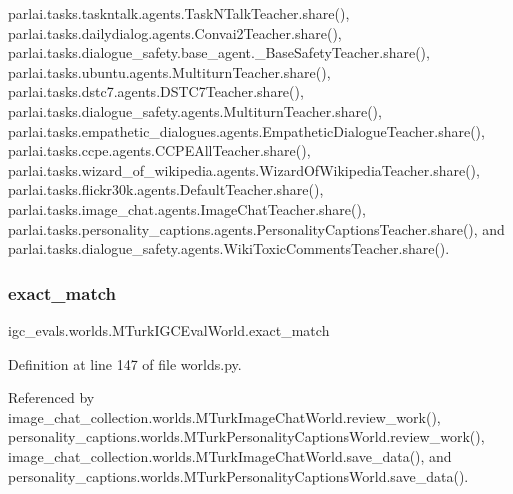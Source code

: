 parlai.\+tasks.\+taskntalk.\+agents.\+Task\+N\+Talk\+Teacher.\+share(), parlai.\+tasks.\+dailydialog.\+agents.\+Convai2\+Teacher.\+share(), parlai.\+tasks.\+dialogue\+\_\+safety.\+base\+\_\+agent.\+\_\+\+Base\+Safety\+Teacher.\+share(), parlai.\+tasks.\+ubuntu.\+agents.\+Multiturn\+Teacher.\+share(), parlai.\+tasks.\+dstc7.\+agents.\+D\+S\+T\+C7\+Teacher.\+share(), parlai.\+tasks.\+dialogue\+\_\+safety.\+agents.\+Multiturn\+Teacher.\+share(), parlai.\+tasks.\+empathetic\+\_\+dialogues.\+agents.\+Empathetic\+Dialogue\+Teacher.\+share(), parlai.\+tasks.\+ccpe.\+agents.\+C\+C\+P\+E\+All\+Teacher.\+share(), parlai.\+tasks.\+wizard\+\_\+of\+\_\+wikipedia.\+agents.\+Wizard\+Of\+Wikipedia\+Teacher.\+share(), parlai.\+tasks.\+flickr30k.\+agents.\+Default\+Teacher.\+share(), parlai.\+tasks.\+image\+\_\+chat.\+agents.\+Image\+Chat\+Teacher.\+share(), parlai.\+tasks.\+personality\+\_\+captions.\+agents.\+Personality\+Captions\+Teacher.\+share(), and parlai.\+tasks.\+dialogue\+\_\+safety.\+agents.\+Wiki\+Toxic\+Comments\+Teacher.\+share().

\mbox{\label{classigc__evals_1_1worlds_1_1MTurkIGCEvalWorld_adba95a00457b873e53ea8e78029c63f9}} 
\subsubsection{\texorpdfstring{exact\+\_\+match}{exact\_match}}
{\footnotesize\ttfamily igc\+\_\+evals.\+worlds.\+M\+Turk\+I\+G\+C\+Eval\+World.\+exact\+\_\+match}



Definition at line 147 of file worlds.\+py.



Referenced by image\+\_\+chat\+\_\+collection.\+worlds.\+M\+Turk\+Image\+Chat\+World.\+review\+\_\+work(), personality\+\_\+captions.\+worlds.\+M\+Turk\+Personality\+Captions\+World.\+review\+\_\+work(), image\+\_\+chat\+\_\+collection.\+worlds.\+M\+Turk\+Image\+Chat\+World.\+save\+\_\+data(), and personality\+\_\+captions.\+worlds.\+M\+Turk\+Personality\+Captions\+World.\+save\+\_\+data().

\mbox{\label{classigc__evals_1_1worlds_1_1MTurkIGCEvalWorld_ab7440083f9c0ff4759784d4e54c1d8d8}} 
